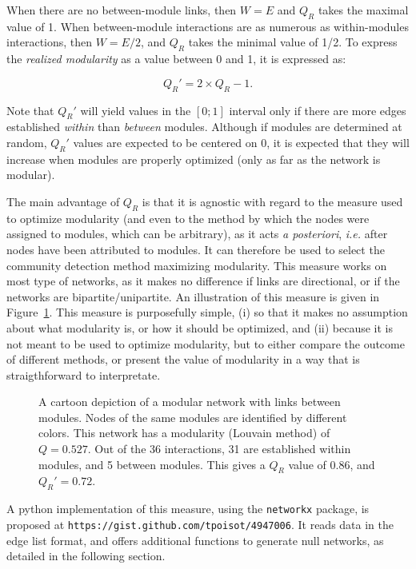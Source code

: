 \documentclass[12pt,oneside]{article}
\begin{document}
When there are no between-module links, then $W = E$ and $Q_R$ takes the
maximal value of 1. When between-module interactions are as numerous as
within-modules interactions, then $W = E/2$, and $Q_R$ takes the minimal value
of 1/2. To express the \emph{realized modularity} as a value between 0 and 1,
it is expressed as:

\begin{equation}
Q_R' = 2\times Q_R - 1 .
\label{e:tqr}
\end{equation}

Note that $Q_R'$ will yield values in the $[0;1]$ interval only if there are
more edges established \emph{within} than \emph{between} modules. Although if
modules are determined at random, $Q_R'$ values are expected to be centered on
0, it is expected that they will increase when modules are properly optimized
(only as far as the network is modular).

The main advantage of $Q_R$ is that it is agnostic with regard to the measure
used to optimize modularity (and even to the method by which the nodes were
assigned to modules, which can be arbitrary), as it acts \emph{a posteriori},
\emph{i.e.} after nodes have been attributed to modules. It can therefore be
used to select the community detection method maximizing modularity. This
measure works on most type of networks, as it makes no difference if links are
directional, or if the networks are bipartite/unipartite. An illustration of
this measure is given in Figure~\ref{f:illu}. This measure is purposefully
simple, (i) so that it makes no assumption about what modularity is, or how it
should be optimized, and (ii) because it is not meant to be used to optimize
modularity, but to either compare the outcome of different methods, or present
the value of modularity in a way that is straigthforward to interpretate.

\begin{figure}[tb]
\begin{center}

\end{center}
\caption{A cartoon depiction of a modular network with links between modules. Nodes of the same modules are identified by different colors. This network has a modularity (Louvain method) of $Q = 0.527$. Out of the 36 interactions, 31 are established within modules, and 5 between modules. This gives a $Q_R$ value of 0.86, and $Q_R' = 0.72$.}
\label{f:illu}
\end{figure}

A python implementation of this measure, using the \texttt{networkx} package,
is proposed at \texttt{https://gist.github.com/tpoisot/4947006}. It reads data in the edge list
format, and offers additional functions to generate null networks, as detailed
in the following section.
\end{document}
